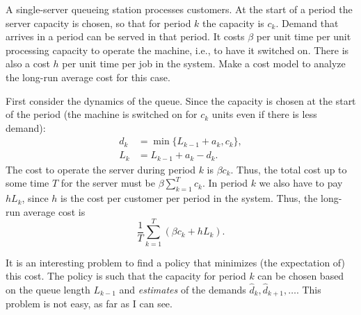 \begin{exercise}
 A single-server queueing station
 processes customers. At the start of a period the server capacity is
 chosen, so that for period $k$ the capacity is $c_k$. Demand that
 arrives in a period can be served in that period. It costs $\beta$
 per unit time per unit processing capacity to operate the machine,
 i.e., to have it switched on. There is also a cost $h$ per unit time
 per job in the system. Make a cost model to analyze the long-run
 average cost for this case.
\begin{solution}
First consider the dynamics of the queue. Since the capacity is chosen at the start of the period (the machine is switched on for $c_k$ units even if there is less demand):
\begin{align*}
 d_k &= \min\{L_{k-1}+a_k, c_k\}, \\
L_k &= L_{k-1}+a_k - d_k.
\end{align*}
The cost to operate the server during period $k$ is $\beta c_k$.
Thus, the total cost up to some time $T$ for the server must be
$\beta \sum_{k=1}^T c_k$. In period $k$ we also have to pay $h L_k$,
since $h$ is the cost per customer per period in the system. Thus, the
long-run average cost is
 \begin{equation*}
 \frac 1T\sum_{k=1}^T \left(\beta c_k + h L_k\right).
 \end{equation*}

 It is an interesting problem to find a policy that minimizes (the
 expectation of) this cost. The policy is such that the capacity
 for period $k$ can be chosen based on the queue length $L_{k-1}$
 and \emph{estimates} of the demands
 $\hat d_k, \hat d_{k+1}, \ldots$. This problem is not easy, as far as I can see. 

\end{solution}
\end{exercise}

